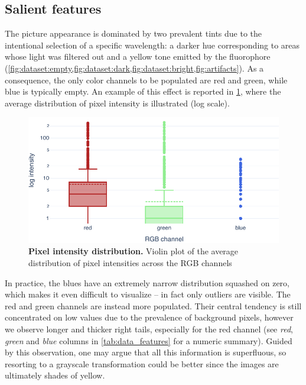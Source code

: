 \subsection{Salient features}
\label{sec:data_features}

The picture appearance is dominated by two prevalent tints due to the intentional selection of a specific wavelength: a darker hue corresponding to areas whose light was filtered out and a yellow tone emitted by the fluorophore
(\cref{fig:dataset:empty,fig:dataset:dark,fig:dataset:bright,fig:artifacts}).
As a consequence, the only color channels to be populated are red and green, while blue is typically empty. 
An example of this effect is reported in \cref{fig:dataset:pixel_intensity}, where the average distribution of pixel intensity is illustrated (log scale).
\begin{figure}
    \centering
    \includegraphics[width=\textwidth]{figures/120_dataset/features/pixel_intensity_distribution.pdf}
    \caption{\textbf{Pixel intensity distribution.} Violin plot of the average distribution of pixel intensities across the  RGB channels}
    \label{fig:dataset:pixel_intensity}
\end{figure}
In practice, the blues have an extremely narrow distribution squashed on zero, which makes it even difficult to visualize -- in fact only outliers are visible. 
The red and green channels are instead more populated. Their central tendency is still concentrated on low values due to the prevalence of background pixels, however we observe longer and thicker right tails, especially for the red channel (see \textit{red}, \textit{green} and \textit{blue} columns in \cref{tab:data_features} for a numeric summary).
Guided by this observation, one may argue that all this information is superfluous, so resorting to a grayscale transformation could be better since the images are ultimately shades of yellow.
